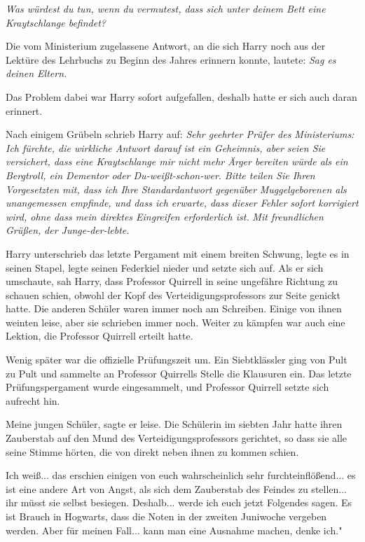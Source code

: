 \emph{\glqq Was würdest du tun, wenn du vermutest, dass sich unter deinem Bett
eine Kraytschlange befindet?\grqq{} }

Die vom Ministerium zugelassene Antwort, an die sich Harry noch aus der Lektüre
des Lehrbuchs zu Beginn des Jahres erinnern konnte, lautete: \emph{Sag es deinen
Eltern.}

Das Problem dabei war Harry sofort aufgefallen, deshalb hatte er sich auch daran
erinnert.

Nach einigem Grübeln schrieb Harry auf:
\emph{Sehr geehrter Prüfer des Ministeriums: }
\emph{Ich fürchte, die wirkliche Antwort darauf ist ein Geheimnis, aber seien Sie versichert, dass eine Kraytschlange mir nicht mehr Ärger bereiten würde als ein Bergtroll, ein Dementor oder Du-weißt-schon-wer.}
\emph{ Bitte teilen Sie Ihren Vorgesetzten mit, dass ich Ihre Standardantwort
gegenüber }\emph{Muggelgeborenen als unangemessen empfinde, und dass ich
erwarte, dass dieser Fehler sofort korrigiert wird, ohne dass mein direktes
Eingreifen erforderlich ist.} \emph{ Mit freundlichen Grüßen, }
\emph{der Junge-der-lebte. }

Harry unterschrieb das letzte Pergament mit einem breiten Schwung, legte es in
seinen Stapel, legte seinen Federkiel nieder und setzte sich auf. Als er sich
umschaute, sah Harry, dass Professor Quirrell in seine ungefähre Richtung zu
schauen schien, obwohl der Kopf des Verteidigungsprofessors zur Seite genickt
hatte. Die anderen Schüler waren immer noch am Schreiben. Einige von ihnen
weinten leise, aber sie schrieben immer noch. Weiter zu kämpfen war auch eine
Lektion, die Professor Quirrell erteilt hatte.

Wenig später war die offizielle Prüfungszeit um. Ein Siebtklässler ging von Pult
zu Pult und sammelte an Professor Quirrells Stelle die Klausuren ein. Das letzte
Prüfungspergament wurde eingesammelt, und Professor Quirrell setzte sich
aufrecht hin.

\glqq Meine jungen Schüler\grqq{}, sagte er leise. Die Schülerin im siebten Jahr
hatte ihren Zauberstab auf den Mund des Verteidigungsprofessors gerichtet, so
dass sie alle seine Stimme hörten, die von direkt neben ihnen zu kommen schien.

\glqq Ich weiß... das erschien einigen von euch wahrscheinlich sehr
furchteinflößend... es ist eine andere Art von Angst, als sich dem Zauberstab
des Feindes zu stellen... ihr müsst sie selbst besiegen. Deshalb... werde ich
euch jetzt Folgendes sagen. Es ist Brauch in Hogwarts, dass die Noten in der
zweiten Juniwoche vergeben werden. Aber für meinen Fall... kann man eine
Ausnahme machen, denke ich."

